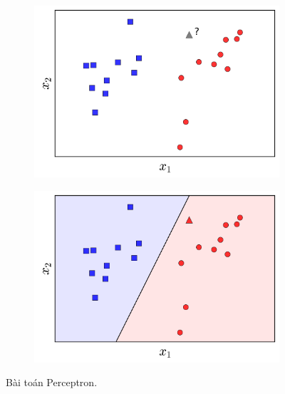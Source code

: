 \begin{figure}[t]
     \begin{subfigure}{0.49\textwidth}
     \includegraphics[width=0.99\linewidth]{Chapters/05_NeuralNetworks/09_perceptron/pla1.png}
     \caption{}
     \end{subfigure}
     \begin{subfigure}{0.49\textwidth}
     \includegraphics[width=0.99\linewidth]{Chapters/05_NeuralNetworks/09_perceptron/pla2.png}
     \caption{}
     \end{subfigure}
     \caption{
      Bài toán Perceptron.
     }
     \label{fig:9_1}
 \end{figure}
  

